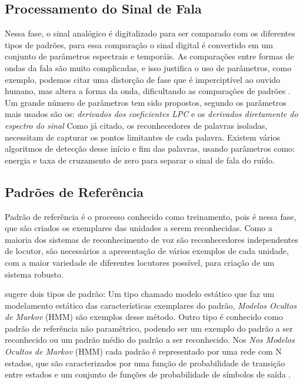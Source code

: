 \subsection{Processamento do Sinal de Fala}
Nessa fase, o sinal analógico é digitalizado para ser comparado com os diferentes tipos de padrões, para essa comparação o sinal digital é convertido em um conjunto de parâmetros espectrais e temporáis. As comparações entre formas de ondas da fala são muito complicadas, e isso justifica o uso de parâmetros, como exemplo, podemos citar uma distorção de fase que é imperciptível ao ouvido humano, mas altera a forma da onda, dificultando as comparações de padrões \cite{AvaliaTecJose}.
Um grande número de parâmetros tem sido propostos, segundo  os parâmetros mais usados são os: \textit{derivados dos coeficientes LPC} e os \textit{derivados diretamente do espectro do sinal}
Como já citado, os reconhecedores de palavras isoladas, necessitam de capturar os pontos limitantes de cada palavra. Existem vários algoritmos de detecção desse início e fim das palavras, usando parâmetros como: energia e taxa de cruzamento de zero para separar o sinal de fala do ruído.

\subsection{Padrões de Referência}
Padrão de referência é o processo conhecido como treinamento, pois é nessa fase, que são criados os exemplares das unidades a serem reconhecidas. Como a maioria dos sistemas de reconhecimento de voz são reconhecedores independentes de locutor, são necessários a apresentação de vários exemplos de cada unidade, com a maior variedade de diferentes locutores possível, para criação de um sistema robusto.

 sugere dois tipos de padrão: Um tipo chamado modelo estático que faz um modelamento estático das características exemplares do padrão, \textit{Modelos Ocultos de Markov} (HMM) são exemplos desse método. Outro tipo é conhecido como padrão de referência não paramêtrico, podendo ser um exemplo do padrão a ser reconhecido ou um padrão médio do padrão a ser reconhecido.
Nos \textit{Nos Modelos Ocultos de Markov} (HMM) cada padrão é representado por uma rede com N estados, que são caracterizados por uma função de probabilidade de transição entre estados e um conjunto de funções de probabilidade de símbolos de saída \cite{AvaliaTecJose}.


